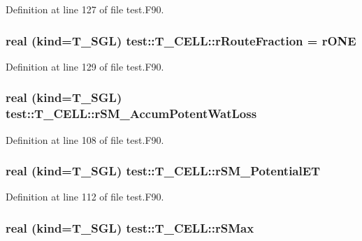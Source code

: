 Definition at line 127 of file test.F90.

\hypertarget{typetest_1_1_t___c_e_l_l_a17d29b87df627b1df85222996eaf300a}{
\subsubsection[{rRouteFraction}]{\setlength{\rightskip}{0pt plus 5cm}real (kind={\bf T\_\-SGL}) {\bf test::T\_\-CELL::rRouteFraction} = {\bf rONE}}}
\label{typetest_1_1_t___c_e_l_l_a17d29b87df627b1df85222996eaf300a}


Definition at line 129 of file test.F90.

\hypertarget{typetest_1_1_t___c_e_l_l_acc89bea06c2701ca3be2d1d64ae332c7}{
\subsubsection[{rSM\_\-AccumPotentWatLoss}]{\setlength{\rightskip}{0pt plus 5cm}real (kind={\bf T\_\-SGL}) {\bf test::T\_\-CELL::rSM\_\-AccumPotentWatLoss}}}
\label{typetest_1_1_t___c_e_l_l_acc89bea06c2701ca3be2d1d64ae332c7}


Definition at line 108 of file test.F90.

\hypertarget{typetest_1_1_t___c_e_l_l_ac598aca037df15f6a7613204732cc38f}{
\subsubsection[{rSM\_\-PotentialET}]{\setlength{\rightskip}{0pt plus 5cm}real (kind={\bf T\_\-SGL}) {\bf test::T\_\-CELL::rSM\_\-PotentialET}}}
\label{typetest_1_1_t___c_e_l_l_ac598aca037df15f6a7613204732cc38f}


Definition at line 112 of file test.F90.

\hypertarget{typetest_1_1_t___c_e_l_l_a602ff0900c6ce7e2d3ddc87ba21d4de7}{
\subsubsection[{rSMax}]{\setlength{\rightskip}{0pt plus 5cm}real (kind={\bf T\_\-SGL}) {\bf test::T\_\-CELL::rSMax}}}
\label{typetest_1_1_t___c_e_l_l_a602ff0900c6ce7e2d3ddc87ba21d4de7}


